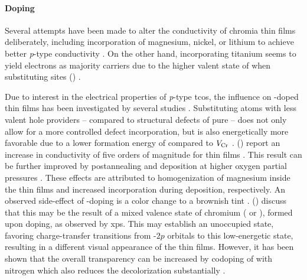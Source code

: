 \paragraph{Doping}
Several attempts have been made to alter the conductivity of chromia thin films deliberately, including incorporation of magnesium, nickel, or lithium to achieve better \textit{p}-type conductivity
    \cite{farrell2015}.
On the other hand, incorporating titanium seems to yield electrons as majority carriers 
    \cite{holt1994}
due to the higher valent state of  when substituting  sites ()
    \cite{kofstad1980}.

Due to interest in the electrical properties of \textit{p}-type \glspl{tco}, the influence on -doped  thin films has been investigated by several studies
    \cite{holt1994,uekawa1996,arca2011,arca2013,farrell2015,arca2017,kehoe2016}.
Substituting  atoms with less valent hole providers -- compared to structural defects of pure  -- does not only allow for a more controlled defect incorporation, but is also energetically more favorable due to a lower formation energy of  compared to $V_{\ce{Cr}}$
    \cite{kehoe2016}.
\citeauthor{uekawa1996} (\citeyear{uekawa1996}) report an increase in conductivity of five orders of magnitude for  thin films
    \cite{uekawa1996}.
This result can be further improved by postannealing
    \cite{farrell2015}
and deposition at higher oxygen partial pressures
    \cite{holt1994,farrell2015}.
These effects are attributed to homogenization of magnesium inside the thin films and increased  incorporation during deposition, respectively.
An observed side-effect of -doping is a color change to a brownish tint
    \cite{uekawa1996,arca2013}.
 (\citeyear{uekawa1996}) discuss that this may be the result of a mixed valence state of chromium ( or ), formed upon doping, as observed by \gls{xps}.
This may establish an unoccupied state, favoring charge-transfer transitions from -$2p$ orbitals to this low-energetic state, resulting in a different visual appearance of the thin films.
However, it has been shown that the overall transparency can be increased by codoping of  with nitrogen which also reduces the decolorization substantially
    \cite{arca2011,arca2013}.
